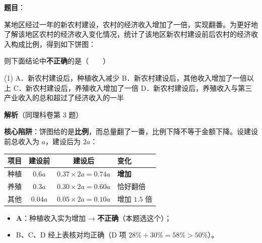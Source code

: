 \begin{answer}

\textbf{题目}：

某地区经过一年的新农村建设，农村的经济收入增加了一倍，实现翻番。为更好地了解该地区农村的经济收入变化情况，统计了该地区新农村建设前后农村的经济收入构成比例，得到如下饼图：
\nopagebreak[4]
\begin{center}\end{center}
\nopagebreak[4]
则下面结论中\textbf{不正确}的是\mbox{（　　）}

\begin{gkopts}(1)
\task A．新农村建设后，种植收入减少
\task B．新农村建设后，其他收入增加了一倍以上
\task C．新农村建设后，养殖收入增加了一倍
\task D．新农村建设后，养殖收入与第三产业收入的总和超过了经济收入的一半
\end{gkopts}

\par\medskip

\Needspace{0.4\textheight}

\textbf{解析}（同理科卷第 3 题）

\textbf{核心陷阱}：饼图给的是\textbf{比例}，而总量翻了一番，比例下降不等于金额下降。设建设前总收入为 $a$，建设后为 $2a$：

\begin{center}
\begin{tabular}{lccl}
\toprule
项目 & 建设前 & 建设后 & 变化 \\
\midrule
种植 & $0.6a$ & $0.37\times2a=0.74a$ & \textbf{增加} \\
养殖 & $0.3a$ & $0.30\times2a=0.60a$ & 恰好翻倍 \\
其他 & $0.04a$ & $0.05\times2a=0.10a$ & 增加 $1.5$ 倍 \\
\bottomrule
\end{tabular}
\end{center}

\begin{itemize}
\item \textbf{A}：种植收入实为增加 → \textbf{不正确}（本题选这个）；
\item B、C、D 经上表核对均正确（D 项 $28\%+30\%=58\%>50\%$）。
\end{itemize}


\par\medskip

\end{answer}
